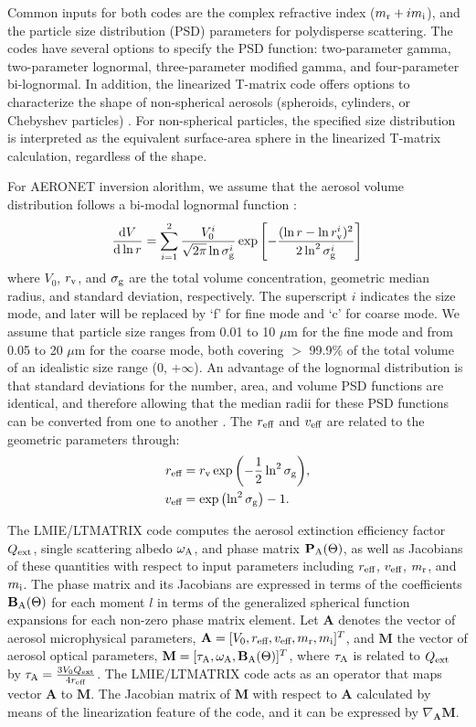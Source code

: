 Common inputs for both codes are the complex refractive index
($m_\text{r} + im_\text{i}$), and the particle size distribution (PSD) 
parameters for polydisperse scattering. The codes have several options 
to specify the PSD function: two-parameter gamma, two-parameter 
lognormal, three-parameter modified gamma, and four-parameter bi-lognormal. 
In addition, the linearized T-matrix code offers options to characterize the 
shape of non-spherical aerosols (spheroids, cylinders, or Chebyshev particles)
\citep{Spurr12}. For non-spherical particles, the specified size distribution 
is interpreted as the equivalent surface-area sphere in the linearized T-matrix
calculation, regardless of the shape. 

For AERONET inversion alorithm, we assume that the aerosol volume
distribution follows a bi-modal lognormal function \citep[in agreement
wit][]{Schuster06, Waquet09}:
\begin{equation}
\frac{\text{d}V}{\text{d}\ln{r}} = \sum_{i=1}^2 
\frac{V_0^i}{\sqrt{2\pi}\ln{\sigma_\text{g}^i}} 
\exp{\left[ -\frac{(\ln{r}-\ln{r_\text{v}^i})^2}{2\ln^2{\sigma_\text{g}^i}}\right]}
\end{equation}
where $V_0$, $r_\text{v}$, and $\sigma_\text{g}$ are the total volume concentration, geometric
median radius, and standard deviation, respectively. The superscript $i$
indicates the size mode, and later will be replaced by ‘f’ for fine mode
and ‘c’ for coarse mode. We assume that particle size ranges from 0.01
to 10 $\mu$m for the fine mode and from 0.05 to 20 $\mu$m for
the coarse mode, both covering $>$ 99.9\% of the total volume of an 
idealistic size range (0, $+\infty$). An advantage of the lognormal 
distribution is that standard deviations for the number, area, and 
volume PSD functions are identical, and therefore allowing that the 
median radii for these PSD functions can be converted from one to 
another \citep{Seinfeld06}. The $r_\text{eff}$ and $v_\text{eff}$ are related to 
the geometric parameters through:
\begin{align}
r_\text{eff} &= r_\text{v} \exp{\left( -\frac{1}{2} \ln^2{\sigma_\text{g}}\right)}, \\
v_\text{eff} & = \exp{\left(\ln^2{\sigma_\text{g}}\right)} - 1.
\end{align}

The LMIE/LTMATRIX code computes the aerosol extinction efficiency
factor $Q_\text{ext}$, single scattering albedo $\omega_\text{A}$, and phase matrix 
$\mathbf{P}_\text{A}(\Theta)$, as well as Jacobians of these quantities with respect
to input parameters including $r_\text{eff}$, $v_\text{eff}$, $m_\text{r}$, and $m_\text{i}$.
The phase matrix and its Jacobians are expressed in terms of the
coefficients $\mathbf{B}_\text{A}(\Theta)$ for each moment $l$ in terms of the 
generalized spherical function expansions
for each non-zero phase matrix element. Let $\mathbf{A}$ denotes the
vector of aerosol microphysical parameters, 
$\mathbf{A}=[V_0,r_\text{eff},v_\text{eff},m_\text{r},m_\text{i}]^T$, and $\mathbf{M}$
the vector of aerosol optical parameters, 
$\mathbf{M}=[\tau_\text{A},\omega_\text{A},\mathbf{B}_\text{A}(\Theta)]^T$, 
where $\tau_\text{A}$ is related to $Q_\text{ext}$ by 
$\tau_\text{A}=\frac{3V_0 Q_\text{ext}}{4r_\text{eff}}$. The LMIE/LTMATRIX code acts
as an operator that maps vector $\mathbf{A}$ to $\mathbf{M}$. 
The Jacobian matrix of $\mathbf{M}$ with respect to $\mathbf{A}$ calculated by 
means of the linearization feature of the code, and it can be expressed by
$\nabla_\mathbf{A}\mathbf{M}$. 

